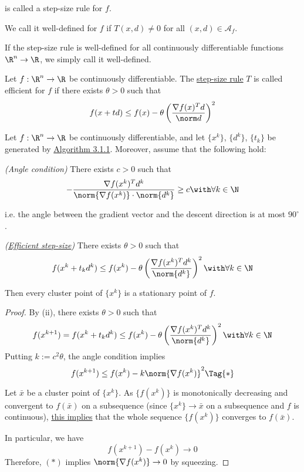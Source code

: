 is called a step-size rule for $f$.

We call it well-defined for $f$ if $T(x,d)\neq0$ for all
$(x,d)\in\mathcal{A}_f$.

If the step-size rule is well-defined for all continuously differentiable
functions ${\R}^n\to{\R}$, we simply call it well-defined.

\label{d23fdf0}

Let $f:\R^n\to\R$ be continuously differentiable. The \href{ae4eac6}{step-size
  rule} $T$ is called efficient for $f$ if there exists $\theta>0$ such that
$$
  f(x+td)\leq f(x)-\theta\left(\frac{\nabla f(x)^Td}{\norm d}\right)^2
$$

\label{aa19bbb}

Let $f:\R^n\to\R$ be continuously differentiable, and let $\{x^k\}$, $\{d^k\}$,
$\{t_k\}$ be generated by \href{edbf62c}{Algorithm 3.1.1}. Moreover, assume
that the following hold:
\begin{enumerati}
  \item \textit{(Angle condition)} There exists $c>0$ such that
  $$
    -\frac{\nabla f(x^k)^Td^k}{\norm{\nabla f(x^k)}\cdot\norm{d^k}}\geq c\with\forall k\in\N
  $$

  i.e. the angle between the gradient vector and the descent direction is at most
  $90^\circ$.
  \item \textit{(\href{d23fdf0}{Efficient step-size})} There exists
  $\theta>0$ such that
  $$
    f(x^k+t_kd^k)\leq f(x^k)-\theta\left(
    \frac{\nabla f(x^k)^Td^k}{\norm{d^k}}
    \right)^2\with\forall k\in\N
  $$
\end{enumerati}
Then every cluster point of $\{x^k\}$ is a stationary point of $f$.

\begin{proof}
  By (ii), there exists $\theta>0$ such that
  $$
    f(x^{k+1})=f(x^k+t_kd^k)\leq
    f(x^k)-\theta\left(
    \frac{\nabla f(x^k)^Td^k}{\norm{d^k}}
    \right)^2\with\forall k\in\N
  $$
  Putting $k:=c^2\theta$, the angle condition implies
  \begin{equation*}
    f(x^{k+1})\leq f(x^k)-k\norm{\nabla f(x^k)}^2\Tag{*}
  \end{equation*}

  Let $\bar x$ be a cluster point of $\{x^k\}$. As $\{f(x^k)\}$ is monotonically
  decreasing and convergent to $f(\bar x)$ on a subsequence (since
  $\{x^k\}\to\bar x$ on a subsequence and $f$ is continuous), \href{aaf3ba6}{this
    implies} that the whole sequence $\{f(x^k)\}$ converges to $f(\bar x)$.

  In particular, we have
  $$
    f(x^{k+1})-f(x^k)\to0
  $$
  Therefore, $(*)$ implies $\norm{\nabla f(x^k)}\to0$ by squeezing.
\end{proof}

